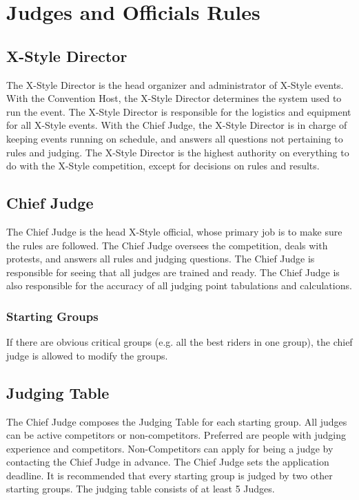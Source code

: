 \chapter{Judges and Officials Rules}

\section{X-Style Director}

The X-Style Director is the head organizer and administrator of X-Style events.
With the Convention Host, the X-Style Director determines the system used to run the event. The X-Style Director is responsible for the logistics and equipment for all X-Style events.
With the Chief Judge, the X-Style Director is in charge of keeping events running on schedule, and answers all questions not pertaining to rules and judging.
The X-Style Director is the highest authority on everything to do with the X-Style competition, except for decisions on rules and results.

\section{Chief Judge}

The Chief Judge is the head X-Style official, whose primary job is to make sure the rules are followed.
The Chief Judge oversees the competition, deals with protests, and answers all rules and judging questions.
The Chief Judge is responsible for seeing that all judges are trained and ready.
The Chief Judge is also responsible for the accuracy of all judging point tabulations and calculations.

\subsection{Starting Groups}
If there are obvious critical groups (e.g. all the best riders in one group), the chief judge is allowed to modify the groups.

\section{Judging Table}

The Chief Judge composes the Judging Table for each starting group.
All judges can be active competitors or non-competitors.
Preferred are people with judging experience and competitors.
Non-Competitors can apply for being a judge by contacting the Chief Judge in advance.
The Chief Judge sets the application deadline.
It is recommended that every starting group is judged by two other starting groups.
The judging table consists of at least 5 Judges.

